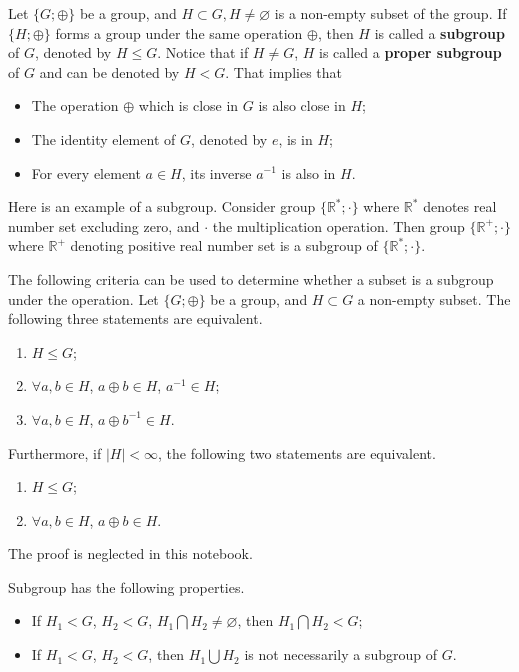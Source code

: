 Let $\{G;\oplus\}$ be a group, and $H\subset G, H\neq\varnothing$ is a non-empty subset of the group. If $\{H;\oplus\}$ forms a group under the same operation $\oplus$, then $H$ is called a \textbf{subgroup} of $G$, denoted by $H\leq G$. Notice that if $H \neq G$, $H$ is called a \textbf{proper subgroup} of $G$ and can be denoted by $H<G$. That implies that
\begin{itemize}
  \item The operation $\oplus$ which is close in $G$ is also close in $H$;
  \item The identity element of $G$, denoted by $e$, is in $H$;
  \item For every element $a\in H$, its inverse $a^{-1}$ is also in $H$.
\end{itemize}
Here is an example of a subgroup. Consider group $\{\mathbb{R}^*; \cdot\}$ where $\mathbb{R}^*$ denotes real number set excluding zero, and $\cdot$ the multiplication operation. Then group $\{\mathbb{R}^+;\cdot\}$ where $\mathbb{R}^+$ denoting positive real number set is a subgroup of  $\{\mathbb{R}^*; \cdot\}$.

The following criteria can be used to determine whether a subset is a subgroup under the operation. Let $\{G;\oplus\}$ be a group, and $H\subset G$ a non-empty subset. The following three statements are equivalent.
\begin{enumerate}[label=(\roman*)]
  \item $H\leq G$;
  \item $\forall a, b\in H$, $a\oplus b \in H$, $a^{-1}\in H$;
  \item $\forall a, b \in H$, $a\oplus b^{-1} \in H$.
\end{enumerate}
Furthermore, if $|H|<\infty$, the following two statements are equivalent.
\begin{enumerate}[label=(\roman*)]
  \item $H\leq G$;
  \item $\forall a, b\in H$, $a\oplus b \in H$.
\end{enumerate}
The proof is neglected in this notebook.


Subgroup has the following properties.  
\begin{itemize}
  \item If $H_1 < G$, $H_2 < G$, $H_1 \bigcap H_2 \neq \varnothing$, then $H_1 \bigcap H_2 < G$;
  \item If $H_1 < G$, $H_2 < G$, then $H_1 \bigcup H_2$ is not necessarily a subgroup of $G$.
\end{itemize}

